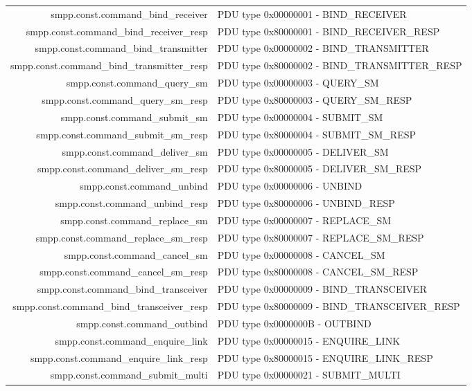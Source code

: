 \documentclass[a4paper,latin]{paper}
\begin{document}
\begin{tabularx}{\linewidth}{ | >{\ttfamily} r | >{\ttfamily} X |}
	smpp.const.command\_bind\_receiver		& PDU type 0x00000001 - BIND\_RECEIVER\\
	smpp.const.command\_bind\_receiver\_resp	& PDU type 0x80000001 - BIND\_RECEIVER\_RESP\\
	smpp.const.command\_bind\_transmitter		& PDU type 0x00000002 - BIND\_TRANSMITTER\\
	smpp.const.command\_bind\_transmitter\_resp	& PDU type 0x80000002 - BIND\_TRANSMITTER\_RESP\\
	smpp.const.command\_query\_sm			& PDU type 0x00000003 - QUERY\_SM\\
	smpp.const.command\_query\_sm\_resp		& PDU type 0x80000003 - QUERY\_SM\_RESP\\
	smpp.const.command\_submit\_sm			& PDU type 0x00000004 - SUBMIT\_SM\\
	smpp.const.command\_submit\_sm\_resp		& PDU type 0x80000004 - SUBMIT\_SM\_RESP\\
	smpp.const.command\_deliver\_sm			& PDU type 0x00000005 - DELIVER\_SM\\
	smpp.const.command\_deliver\_sm\_resp		& PDU type 0x80000005 - DELIVER\_SM\_RESP\\
	smpp.const.command\_unbind			& PDU type 0x00000006 - UNBIND\\
	smpp.const.command\_unbind\_resp		& PDU type 0x80000006 - UNBIND\_RESP\\
	smpp.const.command\_replace\_sm			& PDU type 0x00000007 - REPLACE\_SM\\
	smpp.const.command\_replace\_sm\_resp		& PDU type 0x80000007 - REPLACE\_SM\_RESP\\
	smpp.const.command\_cancel\_sm			& PDU type 0x00000008 - CANCEL\_SM\\
	smpp.const.command\_cancel\_sm\_resp		& PDU type 0x80000008 - CANCEL\_SM\_RESP\\
	smpp.const.command\_bind\_transceiver		& PDU type 0x00000009 - BIND\_TRANSCEIVER\\
	smpp.const.command\_bind\_transceiver\_resp	& PDU type 0x80000009 - BIND\_TRANSCEIVER\_RESP\\
	smpp.const.command\_outbind			& PDU type 0x0000000B - OUTBIND\\
	smpp.const.command\_enquire\_link		& PDU type 0x00000015 - ENQUIRE\_LINK\\
	smpp.const.command\_enquire\_link\_resp		& PDU type 0x80000015 - ENQUIRE\_LINK\_RESP\\
	smpp.const.command\_submit\_multi		& PDU type 0x00000021 - SUBMIT\_MULTI\\

\end{tabularx}
\end{document}
